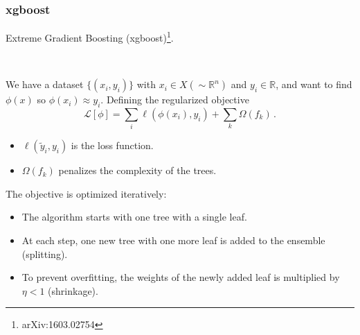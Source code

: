 \documentclass[mathserif, 10pt]{beamer}
\begin{document}
\begin{frame}
    \frametitle{xgboost}

    Extreme Gradient Boosting (xgboost)\footnote[1]{arXiv:1603.02754}.

    ~

    We have a dataset $\{(x_i, y_i)\}$ with $x_i \in X (\sim\mathbb{R}^n)$ and $y_i \in \mathbb{R}$, and want to find $\phi(x)$ so $\phi(x_i)\approx y_i$. Defining the regularized objective
    $$\mathcal{L}[\phi] = \sum_i \ell(\phi(x_i), y_i) + \sum_k \Omega(f_k)\,. $$
\begin{itemize}
    \item $\ell(\tilde{y}_i, y_i)$ is the loss function.
    \item $\Omega(f_k)$ penalizes the complexity of the trees.
\end{itemize}
The objective is optimized iteratively:
\begin{itemize}
    \item The algorithm starts with one tree with a single leaf.
    \item At each step, one new tree with one more leaf is added to the ensemble (splitting).
    \item To prevent overfitting, the weights of the newly added leaf is multiplied by $\eta < 1$ (shrinkage).
\end{itemize}
\end{frame}
\end{document}
